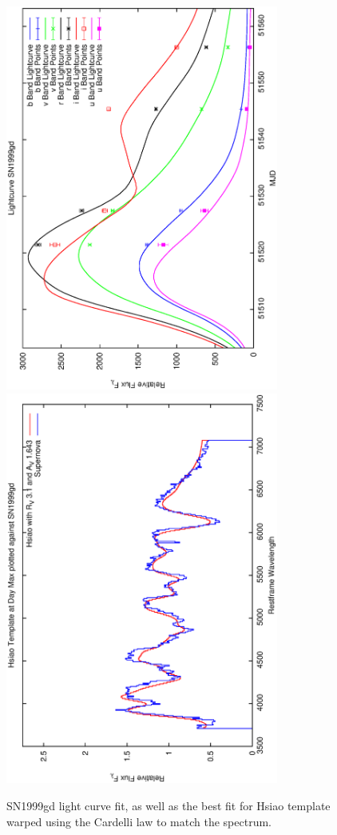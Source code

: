 \clearpage

\begin{figure}[p]
\centering
\includegraphics[angle=-90,width=0.8\textwidth]{./figures/ltcv/SN1999gd_v027_lightcurve.ps}
\hfill
\includegraphics[angle=-90,width=0.8\textwidth]{./figures/hsiao/SN1999gd_v001_hsiao.ps}
\hfill
\caption{SN1999gd light curve fit, as well as the best fit for Hsiao template warped using the Cardelli law to match the spectrum.}
\label{fig:SN1999gdfour2}
\end{figure}

